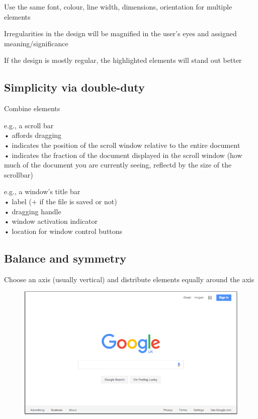 \documentclass[]{project_plan}
\begin{document}
Use the same font, colour, line width, dimensions, orientation for multiple elements

Irregularities in the design will be magnified in the user’s eyes and assigned
meaning/significance

If the design is mostly regular, the highlighted elements will stand out better

\subsection{Simplicity via double-duty}

Combine elements

e.g., a scroll bar\\
• affords dragging\\
• indicates the position of the scroll window relative to the entire document\\
• indicates the fraction of the document displayed in the scroll window (how much of the document you are currently seeing, reflectd by the size of the scrollbar)

e.g., a window’s title bar\\
• label (+ if the file is saved or not)\\
• dragging handle\\
• window activation indicator\\
• location for window control buttons

\subsection{Balance and symmetry}
Choose an axis (usually vertical) and distribute elements equally around the axis
\begin{figure}
  \centering
  \includegraphics[width=0.7\linewidth]{graphic_design_balance_and_symmetry.png}
\end{figure}

\newpage
\end{document}
